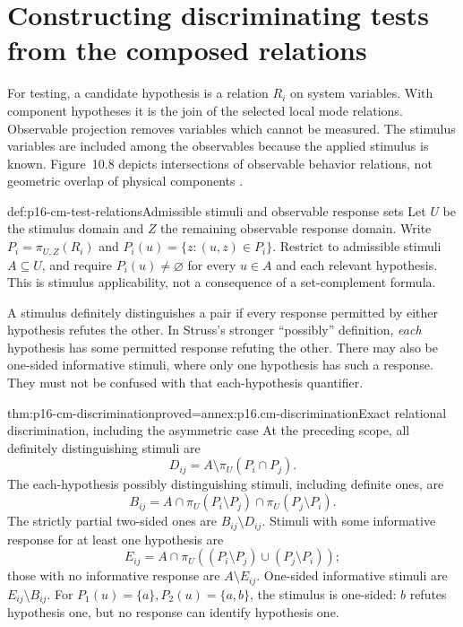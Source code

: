 \section{Constructing discriminating tests from the composed relations}
\label{sec:p16-cm-tests}

For testing, a candidate hypothesis is a relation \(R_i\) on system
variables. With component hypotheses it is the join of the selected local
mode relations. Observable projection removes variables which cannot be
measured. The stimulus variables are included among the observables because
the applied stimulus is known. Figure~10.8 depicts intersections of observable
behavior relations, not geometric overlap of physical components
\cite[pp.~439--443]{Struss2008ModelBasedProblemSolving}.

\begin{hbdefinition}{def:p16-cm-test-relations}{Admissible stimuli and observable response sets}
Let \(U\) be the stimulus domain and \(Z\) the remaining observable
response domain. Write \(P_i=\pi_{U,Z}(R_i)\) and
\(P_i(u)=\{z:(u,z)\in P_i\}\). Restrict to admissible stimuli
\(A\subseteq U\), and require \(P_i(u)\ne\varnothing\) for every
\(u\in A\) and each relevant hypothesis. This is stimulus applicability,
not a consequence of a set-complement formula.

A stimulus definitely distinguishes a pair if every response permitted by
either hypothesis refutes the other. In Struss's stronger ``possibly''
definition, \emph{each} hypothesis has some permitted response refuting
the other. There may also be one-sided informative stimuli, where only one
hypothesis has such a response. They must not be confused with that
each-hypothesis quantifier.
\end{hbdefinition}

\begin{hbtheorem}{thm:p16-cm-discrimination}{proved=annex:p16.cm-discrimination}{Exact relational discrimination, including the asymmetric case}
At the preceding scope, all definitely distinguishing stimuli are
\[
 D_{ij}=A\setminus\pi_U(P_i\cap P_j).
\]
The each-hypothesis possibly distinguishing stimuli, including definite ones,
are
\[
 B_{ij}=A\cap\pi_U(P_i\setminus P_j)
                \cap\pi_U(P_j\setminus P_i).
\]
The strictly partial two-sided ones are \(B_{ij}\setminus D_{ij}\).
Stimuli with some informative response for at least one hypothesis are
\[
 E_{ij}=A\cap\pi_U((P_i\setminus P_j)\cup(P_j\setminus P_i));
\]
those with no informative response are \(A\setminus E_{ij}\).
One-sided informative stimuli are \(E_{ij}\setminus B_{ij}\).
For \(P_1(u)=\{a\},P_2(u)=\{a,b\}\), the stimulus is one-sided:
\(b\) refutes hypothesis one, but no response can identify hypothesis one.
\end{hbtheorem}

